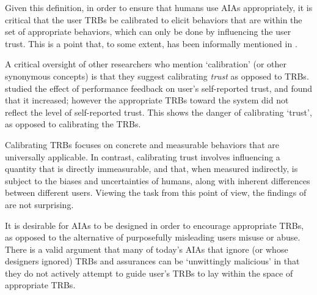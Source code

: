     Given this definition, in order to ensure that humans use AIAs appropriately, it is critical that the user TRBs be calibrated to elicit behaviors that are within the set of appropriate behaviors, which can only be done by influencing the user trust. This is a point that, to some extent, has been informally mentioned in \citet{Muir1994-ow,Muir1987-mk,Lillard2016-yg,Lee2004-pv,Hutchins2015-if}.

    A critical oversight of other researchers who mention `calibration' (or other synonymous concepts) is that they suggest calibrating \emph{trust} as opposed to TRBs. \citet{Dzindolet2003-ts} studied the effect of performance feedback on user's self-reported trust, and found that it increased; however the appropriate TRBs toward the system did not reflect the level of self-reported trust. This shows the danger of calibrating `trust', as opposed to calibrating the TRBs.

    Calibrating TRBs focuses on concrete and measurable behaviors that are universally applicable. In contrast, calibrating trust involves influencing a quantity that is directly immeasurable, and that, when measured indirectly, is subject to the biases and uncertainties of humans, along with inherent differences between different users. Viewing the task from this point of view, the findings of \citeauthor{Dzindolet2003-ts} are not surprising.

    It is desirable for AIAs to be designed in order to encourage appropriate TRBs, as opposed to the alternative of purposefully misleading users misuse or abuse. There is a valid argument that many of today's AIAs that ignore (or whose designers ignored) TRBs and assurances can be `unwittingly malicious' in that they do not actively attempt to guide user's TRBs to lay within the space of appropriate TRBs.
